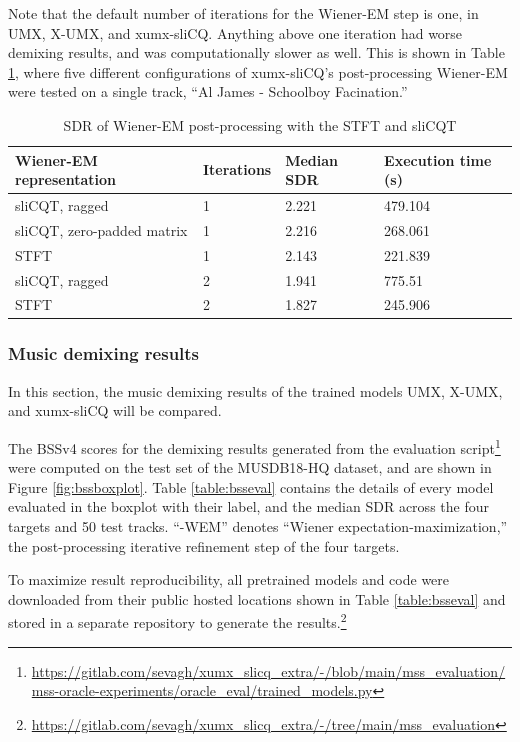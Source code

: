 \documentclass[report.tex]{subfiles}
\begin{document}
Note that the default number of iterations for the Wiener-EM step is one, in UMX, X-UMX, and xumx-sliCQ. Anything above one iteration had worse demixing results, and was computationally slower as well. This is shown in Table \ref{table:wienerem}, where five different configurations of xumx-sliCQ's post-processing Wiener-EM were tested on a single track, ``Al James - Schoolboy Facination.''

\begin{table}[ht]
	\centering
	\caption{SDR of Wiener-EM post-processing with the STFT and sliCQT}
	\label{table:wienerem}
	\begin{tabular}{ |l|l|l|l| }
	 \hline
		Wiener-EM representation & Iterations & Median SDR & Execution time (s) \\
	 \hline
	 \hline
		sliCQT, ragged & 1 & 2.221 & 479.104 \\
	 \hline
		sliCQT, zero-padded matrix & 1 & 2.216 & 268.061  \\
	 \hline
		STFT & 1 & 2.143 & 221.839  \\
	 \hline
		sliCQT, ragged & 2 & 1.941 & 775.51  \\
	 \hline
		STFT & 2 & 1.827 & 245.906  \\
	 \hline
\end{tabular}
\end{table}

\subsubsection{Music demixing results}
\label{sec:demixresults}

In this section, the music demixing results of the trained models UMX, X-UMX, and xumx-sliCQ will be compared.

The BSSv4 scores for the demixing results generated from the evaluation script\footnote{\url{https://gitlab.com/sevagh/xumx_slicq_extra/-/blob/main/mss_evaluation/mss-oracle-experiments/oracle_eval/trained_models.py}} were computed on the test set of the MUSDB18-HQ dataset, and are shown in Figure \ref{fig:bssboxplot}. Table \ref{table:bsseval} contains the details of every model evaluated in the boxplot with their label, and the median SDR across the four targets and 50 test tracks. ``-WEM'' denotes ``Wiener expectation-maximization,'' the post-processing iterative refinement step of the four targets.

To maximize result reproducibility, all pretrained models and code were downloaded from their public hosted locations shown in Table \ref{table:bsseval} and stored in a separate repository to generate the results.\footnote{\url{https://gitlab.com/sevagh/xumx_slicq_extra/-/tree/main/mss_evaluation}}
\end{document}
